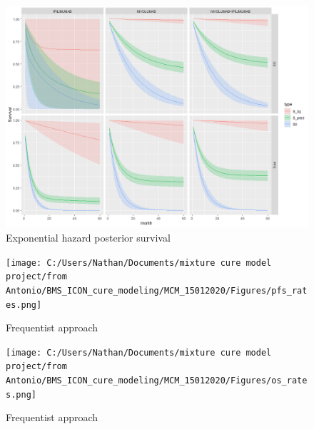 \documentclass[
]{article}
\begin{document}
\begin{figure}
\centering
\includegraphics{../plots/exp_posterior_S_all.png}
\caption{Exponential hazard posterior survival}
\end{figure}

\begin{figure}
\centering
\texttt{[image: C:/Users/Nathan/Documents/mixture cure model project/from Antonio/BMS\_ICON\_cure\_modeling/MCM\_15012020/Figures/pfs\_rates.png]}
\caption{Frequentist approach}
\end{figure}

\begin{figure}
\centering
\texttt{[image: C:/Users/Nathan/Documents/mixture cure model project/from Antonio/BMS\_ICON\_cure\_modeling/MCM\_15012020/Figures/os\_rates.png]}
\caption{Frequentist approach}
\end{figure}
\end{document}
